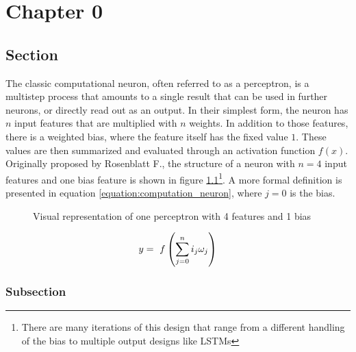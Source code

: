 \chapter{Chapter 0} %

\label{chapter:0} %


\newcommand{\keyword}[1]{\textbf{#1}}
\newcommand{\tabhead}[1]{\textbf{#1}}
\newcommand{\code}[1]{\texttt{#1}}
\newcommand{\file}[1]{\texttt{\bfseries#1}}
\newcommand{\option}[1]{\texttt{\itshape#1}}


\section{Section}
The classic computational neuron, often referred to as a perceptron, is a multistep process that amounts to a single result that can be used in further neurons, or directly read out as an output. In their simplest form, the neuron has $n$ input features that are multiplied with $n$ weights. In addition to those features, there is a weighted bias, where the feature itself has the fixed value $1$. These values are then summarized and evaluated through an activation function $f(x)$. Originally proposed by Rosenblatt F.\cite{rosenblatt_perceptron_1958}, the structure of a neuron with $n = 4$ input features and one bias feature is shown in figure \ref{figure:computation_neuron}\footnote{There are many iterations of this design that range from a different handling of the bias to multiple output designs like LSTMs\cite{lstm}}. A more formal definition is presented in equation \ref{equation:computation_neuron}, where $j=0$ is the bias.

\begin{figure}[h!]
    \centering
    \caption{Visual representation of one perceptron with 4 features and 1 bias}
    \label{figure:computation_neuron}
\end{figure}

\begin{equation}
    \centering
    y =\ f\left(\sum_{j = 0}^n i_j\omega_j\right)
    \label{equation:computation_neuron}
\end{equation}

\subsection{Subsection}

\newpage
